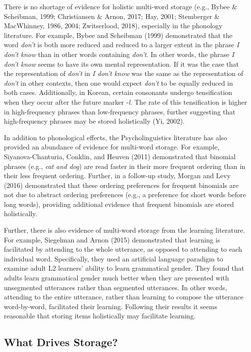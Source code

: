 \documentclass[
  man,floatsintext]{apa6}
\begin{document}
There is no shortage of evidence for holistic multi-word storage (e.g., Bybee \& Scheibman, 1999; Christiansen \& Arnon, 2017; Hay, 2001; Stemberger \& MacWhinney, 1986, 2004; Zwitserlood, 2018), especially in the phonology literature. For example, Bybee and Scheibman (1999) demonstrated that the word \emph{don't} is both more reduced and reduced to a larger extent in the phrase \emph{I don't know} than in other words containing \emph{don't}. In other words, the phrase \emph{I don't know} seems to have its own mental representation. If it was the case that the representation of \emph{don't} in \emph{I don't know} was the same as the representation of \emph{don't} in other contexts, then one would expect \emph{don't} to be equally reduced in both cases. Additionally, in Korean, certain consonants undergo tensification when they occur after the future marker -\emph{l}. The rate of this tensification is higher in high-frequency phrases than low-frequency phrases, further suggesting that high-frequency phrases may be stored holistically (Yi, 2002).

In addition to phonological effects, the Psycholinguistics literature has also provided an abundance of evidence for multi-word storage. For example, Siyanova-Chanturia, Conklin, and Heuven (2011) demonstrated that binomial phrases (e.g., \emph{cat and dog}) are read faster in their more frequent ordering than in their less frequent ordering. Further, in a follow-up study, Morgan and Levy (2016) demonstrated that these ordering preferences for frequent binomials are not due to abstract ordering preferences (e.g., a preference for short words before long words), providing additional evidence that frequent binomials are stored holistically.

Further, there is also evidence of multi-word storage from the learning literature. For example, Siegelman and Arnon (2015) demonstrated that learning is facilitated by attending to the whole utterance, as opposed to attending to each individual word. Specifically, they used an artificial language paradigm to examine adult L2 learners' ability to learn grammatical gender. They found that adults learn grammatical gender much better when they are presented with unsegmented utterances rather than segmented utterances. In other words, attending to the entire utterance, rather than learning to compose the utterance word-by-word, facilitated their learning. Following their results it seems reasonable that storing items holistically may facilitate learning.

\subsection{What Drives Storage?}\label{what-drives-storage}
\end{document}
